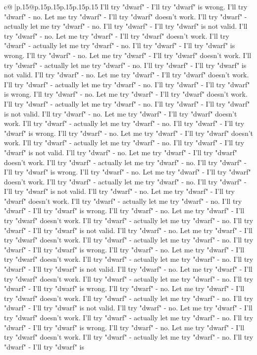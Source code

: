 \documentclass{article}
\begin{document}
{\begin{supertabular}{c@{$\;$}|p{.15\linewidth}@{}p{.15\linewidth}p{.15\linewidth}p{.15\linewidth}p{.15\linewidth}p{.15\linewidth}}
{{{I'll try "dwarf" {-} I'll try "dwarf" is wrong. I'll try "dwarf" {-} no. Let me try "dwarf" {-} I'll try "dwarf" doesn't work. I'll try "dwarf" {-} actually let me try "dwarf" {-} no. I'll try "dwarf" {-} I'll try "dwarf" is not valid. I'll try "dwarf" {-} no. Let me try "dwarf" {-} I'll try "dwarf" doesn't work. I'll try "dwarf" {-} actually let me try "dwarf" {-} no. I'll try "dwarf" {-} I'll try "dwarf" is wrong. I'll try "dwarf" {-} no. Let me try "dwarf" {-} I'll try "dwarf" doesn't work. I'll try "dwarf" {-} actually let me try "dwarf" {-} no. I'll try "dwarf" {-} I'll try "dwarf" is not valid. I'll try "dwarf" {-} no. Let me try "dwarf" {-} I'll try "dwarf" doesn't work. I'll try "dwarf" {-} actually let me try "dwarf" {-} no. I'll try "dwarf" {-} I'll try "dwarf" is wrong. I'll try "dwarf" {-} no. Let me try "dwarf" {-} I'll try "dwarf" doesn't work. I'll try "dwarf" {-} actually let me try "dwarf" {-} no. I'll try "dwarf" {-} I'll try "dwarf" is not valid. I'll try "dwarf" {-} no. Let me try "dwarf" {-} I'll try "dwarf" doesn't work. I'll try "dwarf" {-} actually let me try "dwarf" {-} no. I'll try "dwarf" {-} I'll try "dwarf" is wrong. I'll try "dwarf" {-} no. Let me try "dwarf" {-} I'll try "dwarf" doesn't work. I'll try "dwarf" {-} actually let me try "dwarf" {-} no. I'll try "dwarf" {-} I'll try "dwarf" is not valid. I'll try "dwarf" {-} no. Let me try "dwarf" {-} I'll try "dwarf" doesn't work. I'll try "dwarf" {-} actually let me try "dwarf" {-} no. I'll try "dwarf" {-} I'll try "dwarf" is wrong. I'll try "dwarf" {-} no. Let me try "dwarf" {-} I'll try "dwarf" doesn't work. I'll try "dwarf" {-} actually let me try "dwarf" {-} no. I'll try "dwarf" {-} I'll try "dwarf" is not valid. I'll try "dwarf" {-} no. Let me try "dwarf" {-} I'll try "dwarf" doesn't work. I'll try "dwarf" {-} actually let me try "dwarf" {-} no. I'll try "dwarf" {-} I'll try "dwarf" is wrong. I'll try "dwarf" {-} no. Let me try "dwarf" {-} I'll try "dwarf" doesn't work. I'll try "dwarf" {-} actually let me try "dwarf" {-} no. I'll try "dwarf" {-} I'll try "dwarf" is not valid. I'll try "dwarf" {-} no. Let me try "dwarf" {-} I'll try "dwarf" doesn't work. I'll try "dwarf" {-} actually let me try "dwarf" {-} no. I'll try "dwarf" {-} I'll try "dwarf" is wrong. I'll try "dwarf" {-} no. Let me try "dwarf" {-} I'll try "dwarf" doesn't work. I'll try "dwarf" {-} actually let me try "dwarf" {-} no. I'll try "dwarf" {-} I'll try "dwarf" is not valid. I'll try "dwarf" {-} no. Let me try "dwarf" {-} I'll try "dwarf" doesn't work. I'll try "dwarf" {-} actually let me try "dwarf" {-} no. I'll try "dwarf" {-} I'll try "dwarf" is wrong. I'll try "dwarf" {-} no. Let me try "dwarf" {-} I'll try "dwarf" doesn't work. I'll try "dwarf" {-} actually let me try "dwarf" {-} no. I'll try "dwarf" {-} I'll try "dwarf" is not valid. I'll try "dwarf" {-} no. Let me try "dwarf" {-} I'll try "dwarf" doesn't work. I'll try "dwarf" {-} actually let me try "dwarf" {-} no. I'll try "dwarf" {-} I'll try "dwarf" is wrong. I'll try "dwarf" {-} no. Let me try "dwarf" {-} I'll try "dwarf" doesn't work. I'll try "dwarf" {-} actually let me try "dwarf" {-} no. I'll try "dwarf" {-} I'll try "dwarf" is }}}
\end{supertabular}}
\end{document}
